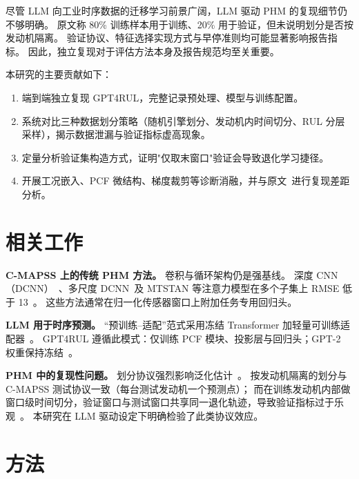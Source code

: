 \documentclass[UTF8,a4paper,10pt,twocolumn]{ctexart}
\begin{document}
尽管 LLM 向工业时序数据的迁移学习前景广阔，LLM 驱动 PHM 的复现细节仍不够明确。
原文称 80\% 训练样本用于训练、20\% 用于验证，但未说明划分是否按发动机隔离。
验证协议、特征选择实现方式与早停准则均可能显著影响报告指标。
因此，独立复现对于评估方法本身及报告规范均至关重要。

本研究的主要贡献如下：
\begin{enumerate}
  \item 端到端独立复现 GPT4RUL，完整记录预处理、模型与训练配置。
  \item 系统对比三种数据划分策略（随机引擎划分、发动机内时间切分、RUL 分层采样），揭示数据泄漏与验证指标虚高现象。
  \item 定量分析验证集构造方式，证明"仅取末窗口"验证会导致退化学习捷径。
  \item 开展工况嵌入、PCF 微结构、梯度裁剪等诊断消融，并与原文~\cite{tan2025}进行复现差距分析。
\end{enumerate}

\section{相关工作}

\textbf{C-MAPSS 上的传统 PHM 方法。}
卷积与循环架构仍是强基线。
深度 CNN（DCNN）~\cite{li2018}、多尺度 DCNN~\cite{li2020}及 MTSTAN 等注意力模型在多个子集上 RMSE 低于 13~\cite{tan2025}。
这些方法通常在归一化传感器窗口上附加任务专用回归头。

\textbf{LLM 用于时序预测。}
``预训练--适配''范式采用冻结 Transformer 加轻量可训练适配器~\cite{radford2019,tolstikhin2021}。
GPT4RUL 遵循此模式：仅训练 PCF 模块、投影层与回归头；GPT-2 权重保持冻结~\cite{tan2025}。

\textbf{PHM 中的复现性问题。}
划分协议强烈影响泛化估计~\cite{saxena2008}。
按发动机隔离的划分与 C-MAPSS 测试协议一致（每台测试发动机一个预测点）；
而在训练发动机内部做窗口级时间切分，验证窗口与测试窗口共享同一退化轨迹，导致验证指标过于乐观~\cite{tan2025}。
本研究在 LLM 驱动设定下明确检验了此类协议效应。

\section{方法}
\end{document}
